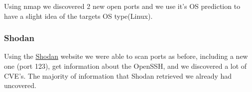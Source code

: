 Using nmap we discovered 2 new open ports and we use it's OS prediction to have a slight idea of the targets OS type(Linux).
 
\subsubsection{Shodan}

Using the \href{https://www.shodan.io/host/45.33.32.156}{Shodan} website we were able to scan ports as before, including a new one (port 123), get information about the OpenSSH, and we discovered a lot of CVE's. The majority of information that Shodan retrieved we already had uncovered.
    

\pagebreak